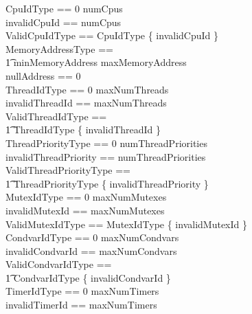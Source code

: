 \documentclass[11pt,letterpaper,twoside,openany]{book}
\begin{document}
\begin{zed}
    CpuIdType == 0 \upto numCpus \\
    invalidCpuId == numCpus \\
    ValidCpuIdType == CpuIdType \setminus \{ invalidCpuId \} \\
    MemoryAddressType == \\
    \t1 minMemoryAddress \upto maxMemoryAddress \\
    nullAddress == 0 \\
    ThreadIdType == 0 \upto maxNumThreads \\
    invalidThreadId == maxNumThreads \\
    ValidThreadIdType == \\
    \t1 ThreadIdType \setminus \{ invalidThreadId \} \\
    ThreadPriorityType == 0 \upto numThreadPriorities \\
    invalidThreadPriority == numThreadPriorities \\
    ValidThreadPriorityType == \\
    \t1 ThreadPriorityType \setminus \{ invalidThreadPriority \} \\
    MutexIdType == 0 \upto maxNumMutexes \\
    invalidMutexId == maxNumMutexes \\
    ValidMutexIdType == MutexIdType \setminus \{ invalidMutexId \} \\
    CondvarIdType == 0 \upto maxNumCondvars \\
    invalidCondvarId == maxNumCondvars \\
    ValidCondvarIdType == \\
    \t1 CondvarIdType \setminus \{ invalidCondvarId \} \\
    TimerIdType == 0 \upto maxNumTimers \\
    invalidTimerId == maxNumTimers \\
\end{zed}
\end{document}
